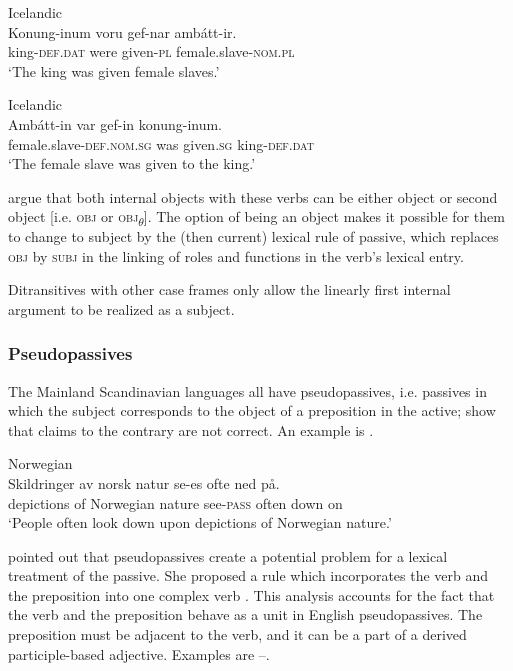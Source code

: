 \documentclass[output=paper,hidelinks]{langscibook}
\begin{document}
\ea\label{ex:Scandinavian:84} Icelandic \citep[460]{ZMT85:Case}\\
\gll
 {Konung-inum} {voru} {gef-nar} {ambátt-ir.} \\
 king-\textsc{def.dat} were given-\textsc{pl} female.slave-\textsc{nom.pl}\\
\glt `The king was given female slaves.'\z



\ea\label{ex:Scandinavian:85} Icelandic \citep[460]{ZMT85:Case}\\
\gll
 {Ambátt-in} {var} {gef-in} {konung-inum.}\\
 female.slave\textsc{{}-def.nom.sg} was given.\textsc{sg} king-\textsc{def.dat}\\
\glt `The female slave was given to the king.'\z

\noindent \citet{ZMT85:Case} argue that both internal objects with these verbs can be either object or second object [i.e. \textsc{obj} or \textsc{obj}\textsubscript{${\theta}$}]. The option of being an object makes it possible for them to change to subject by the (then current) lexical rule of passive, which replaces \textsc{obj} by \textsc{subj} in the linking of roles and functions in the verb's lexical entry.

 Ditransitives with other case frames only allow the linearly first internal argument to be realized as a subject.

\subsubsection{Pseudopassives}

The Mainland Scandinavian languages all have pseudopassives, i.e. passives in which the subject corresponds to the object of a preposition in the active; \citet{EL15} show that claims to the contrary are not correct. An example is .



\ea\label{ex:Scandinavian:86} Norwegian \\
\gll
 {Skildringer} {av} {norsk} {natur} {se-es} {ofte} {ned} {på.}\\
 depictions of Norwegian nature see-\textsc{pass} often down on\\
\glt `People often look down upon depictions of Norwegian nature.'\z

\noindent \citet{bresnan1982the-passive} pointed out that pseudopassives create a potential problem for a lexical treatment of the passive. She proposed a rule which incorporates the verb and the preposition into one complex verb \citep[50--59]{bresnan1982the-passive}. This analysis accounts for the fact that the verb and the preposition behave as a unit in English pseudopassives. The preposition must be adjacent to the verb, and it can be a part of a derived participle-based adjective. Examples are --.
\end{document}
